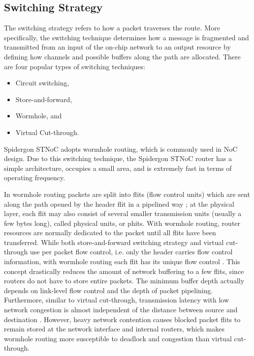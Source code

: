 
\subsection{Switching Strategy}\label{S:switching}

The switching strategy refers to how a packet traverses the route. 
More specifically, the switching technique determines how a message is fragmented and transmitted from an input of the on-chip network to an output resource by defining how channels and possible buffers along the path are allocated. 
There are four popular types of switching techniques:
\begin{itemize}
\item Circuit switching,
\item Store-and-forward,
\item Wormhole, and 
\item Virtual Cut-through.
\end{itemize}

Spidergon STNoC adopts wormhole routing, which is commonly used in NoC design. 
Due to this switching technique, the Spidergon STNoC router has a simple architecture, occupies a small area, and is extremely fast in terms of operating frequency.

In wormhole routing packets are split into flits (flow control units) which are sent along the path opened by the header flit in a pipelined way \cite{dally1987deadlock}; at the physical layer, each flit may also consist of several smaller transmission units (usually a few bytes long), called physical units, or phits. 
With wormhole routing, router resources are normally dedicated to the packet until all flits have been transferred. 
While both store-and-forward switching strategy and virtual cut-through use per packet flow control, i.e. only the header carries flow control information, with wormhole routing each flit has its unique flow control \cite{dally1987deadlock}. 
This concept drastically reduces the amount of network buffering to a few flits, since routers do not have to store entire packets. The minimum buffer depth actually depends on link-level flow control and the depth of packet pipelining. 
Furthermore, similar to virtual cut-through, transmission latency with low network congestion is almost independent of the distance between source and destination \cite{dally1990performance}. 
However, heavy network contention causes blocked packet flits to remain stored at the network interface and internal routers, which makes wormhole routing more susceptible to deadlock and congestion than virtual cut-through.

